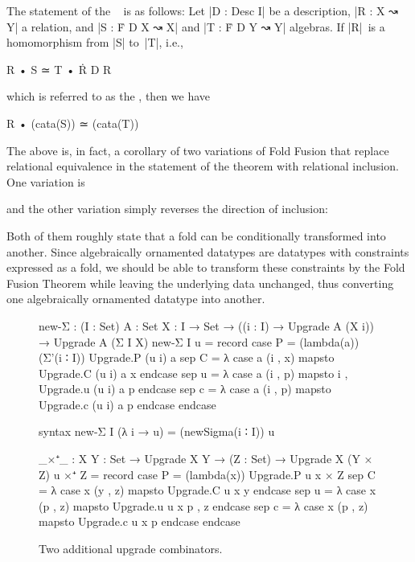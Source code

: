 The statement of the ~\cite[Section~6.2]{Bird-AoP} is as follows:
Let |D : Desc I| be a description, |R : X ↝ Y| a relation, and |S : Ḟ D X ↝ X| and |T : Ḟ D Y ↝ Y| algebras.
If |R|~is a homomorphism from |S| to~|T|, i.e.,
\begin{code}
R • S ≃ T • Ṙ D R
\end{code}
which is referred to as the , then we have
\begin{code}
R • (cata(S)) ≃ (cata(T))
\end{code}
The above is, in fact, a corollary of two variations of Fold Fusion that replace relational equivalence in the statement of the theorem with relational inclusion.
One variation is
and the other variation simply reverses the direction of inclusion:
Both of them roughly state that a fold can be conditionally transformed into another.
Since algebraically ornamented datatypes are datatypes with constraints expressed as a fold, we should be able to transform these constraints by the Fold Fusion Theorem while leaving the underlying data unchanged, thus converting one algebraically ornamented datatype into another.

\begin{figure}
\codefigure
\begin{code}
new-Σ :  (I : Set) {A : Set} {X : I → Set} →
         ((i : I) → Upgrade A (X i)) → Upgrade A (Σ I X)
new-Σ I u = record  case  P  = (lambda(a)) (Σ'(i ∶ I)) Upgrade.P (u i) a
                    sep   C  = λ case a (i , x) mapsto Upgrade.C (u i) a x      endcase
                    sep   u  = λ case a (i , p) mapsto i , Upgrade.u (u i) a p  endcase
                    sep   c  = λ case a (i , p) mapsto Upgrade.c (u i) a p      endcase endcase

syntax new-Σ I (λ i → u) = (newSigma(i ∶ I)) u

_×⁺_ : {X Y : Set} → Upgrade X Y → (Z : Set) → Upgrade X (Y × Z)
u ×⁺ Z = record  case  P  = (lambda(x)) Upgrade.P u x × Z
                 sep   C  = λ case x (y , z) mapsto Upgrade.C u x y      endcase
                 sep   u  = λ case x (p , z) mapsto Upgrade.u u x p , z  endcase
                 sep   c  = λ case x (p , z) mapsto Upgrade.c u x p      endcase endcase
\end{code}
\caption{Two additional upgrade combinators.}
\label{fig:fusion-upgrade-combinators}
\end{figure}

